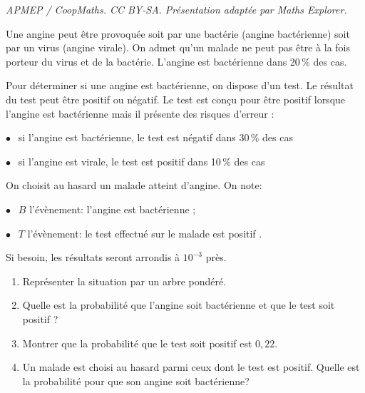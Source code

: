 \documentclass[10pt]{article}
\begin{document}
\noindent\textit{APMEP / CoopMaths. CC BY-SA. Présentation adaptée par Maths Explorer.}\par\medskip
\medskip

Une angine peut être provoquée soit par une bactérie (angine bactérienne) soit par un virus (angine virale). On admet qu'un malade ne peut pas être à la fois porteur du virus et de la bactérie. L'angine est bactérienne dans 20\,\% des cas.

Pour déterminer si une angine est bactérienne, on dispose d'un test. Le résultat du test peut être positif ou négatif. Le test est conçu pour être positif lorsque l'angine est bactérienne mais il présente des risques d'erreur :

\medskip

$\bullet~~$ si l'angine est bactérienne, le test est négatif dans 30\,\% des cas

$\bullet~~$ si l'angine est virale, le test est positif dans 10\,\% des cas

\medskip

On choisit au hasard un malade atteint d'angine. On note:

$\bullet~~$ $B$ l'évènement: \og l'angine est bactérienne \fg{} ;

$\bullet~~$ $T$ l'évènement: \og le test effectué sur le malade est positif \fg. 

\medskip

Si besoin, les résultats seront arrondis à $10^{-3}$ près.

\medskip

\begin{enumerate}
\item Représenter la situation par un arbre pondéré.
\item Quelle est la probabilité que l'angine soit bactérienne et que le test soit positif ?
\item Montrer que la probabilité que le test soit positif est $0,22$.
\item Un malade est choisi au hasard parmi ceux dont le test est positif. Quelle est la
probabilité pour que son angine soit bactérienne?
\end{enumerate}
\end{document}
